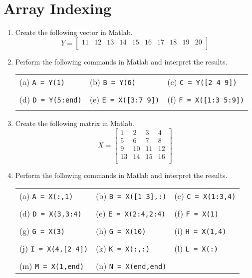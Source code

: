\documentclass{pass}
\begin{document}
\section*{Array Indexing}
\begin{enumerate}[resume]
\item Create the following vector in Matlab.\\
$$Y = \left[ {\begin{array}{cccccccccc}
 	11 & 12 & 13 & 14 & 15 & 16 & 17 & 18 & 19 & 20 \\
\end{array} } \right]$$
\item Perform the following commands in Matlab and interpret the results.\\
\begin{tabularx}{\textwidth}{XXX}
(a) \texttt{A = Y(1)} & 
(b) \texttt{B = Y(6)} &
(c) \texttt{C = Y([2 4 9])} \\ \\
(d) \texttt{D = Y(5:end)} &
(e) \texttt{E = X([3:7 9])} &
(f) \texttt{F = X([1:3 5:9])} \\ \\
 \end{tabularx}
\pagebreak
\item Create the following matrix in Matlab.
$$X = \left[ {\begin{array}{cccc}
 	1 & 2 & 3 & 4 \\
 	5 & 6 & 7 & 8 \\
	9 & 10 & 11 & 12 \\
	13 & 14 & 15 & 16 \\
\end{array} } \right]$$
\item Perform the following commands in Matlab and interpret the results.\\
\begin{tabularx}{\textwidth}{XXX}
(a) \texttt{A = X(:,1)} & 
(b) \texttt{B = X([1 3],:)} &
(c) \texttt{C = X(1:3,4)} \\ \\
(d) \texttt{D = X(3,3:4)} &
(e) \texttt{E = X(2:4,2:4)} &
(f) \texttt{F = X(1)} \\ \\
(g) \texttt{G = X(3)} &
(h) \texttt{G = X(10)} &
(i) \texttt{H = X(1,4)} \\ \\
(j) \texttt{I = X(4,[2 4])} &
(k) \texttt{K = X(:,:)} &
(l) \texttt{L = X(:)} \\ \\
(m) \texttt{M = X(1,end)} &
(n) \texttt{N = X(end,end)} &
\end{tabularx}
\end{enumerate}
\end{document}
